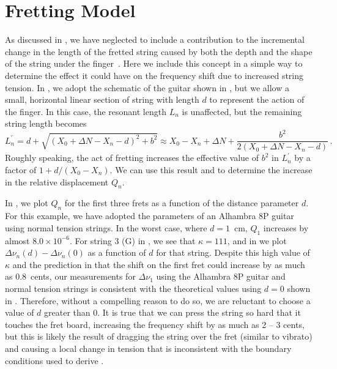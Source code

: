 %
%
%

 \section{Fretting Model\label{app:fret}}

As discussed in , we have neglected to include a contribution to the incremental change in the length of the fretted string caused by both the depth and the shape of the string under the finger~\cite{ref:byers1996cgi,ref:varieschi2010icf}. Here we include this concept in a simple way to determine the effect it could have on the frequency shift due to increased string tension. In , we adopt the schematic of the guitar shown in , but we allow a small, horizontal linear section of string with length $d$ to represent the action of the finger. In this case, the resonant length $L_n$ is unaffected, but the remaining string length becomes
 \begin{equation}
L^\prime_n = d + \sqrt{\left(X_0 + \Delta N - X_n - d\right)^2 + b^2} \approx X_0 - X_n + \Delta N + \frac{b^2}{2 \left(X_0 + \Delta N - X_n - d\right)}\, .
 \end{equation}
Roughly speaking, the act of fretting increases the effective value of $b^2$ in $L^\prime_n$ by a factor of $1 + d / (X_0 - X_n)$. We can use this result and  to determine the increase in the relative displacement $Q_n$.

In , we plot $Q_n$ for the first three frets as a function of the distance parameter $d$. For this example, we have adopted the parameters of an Alhambra 8P guitar using normal tension strings. In the worst case, where $d = 1$~cm, $Q_1$ increases by almost $8.0 \times 10^{-6}$. For string 3 (G) in , we see that $\kappa = 111$, and in  we plot $\Delta \nu_n(d) - \Delta \nu_n(0)$ as a function of $d$ for that string. Despite this high value of $\kappa$ and the prediction in  that the shift on the first fret could increase by as much as 0.8~cents, our measurements for $\Delta \nu_1$ using the Alhambra 8P guitar and normal tension strings is consistent with the theoretical values using $d = 0$ shown in . Therefore, without a compelling reason to do so, we are reluctant to choose a value of $d$ greater than 0. It is true that we can press the string so hard that it touches the fret board, increasing the frequency shift by as much as 2 -- 3 cents, but this is likely the result of dragging the string over the fret (similar to vibrato) and causing a local change in tension that is inconsistent with the boundary conditions used to derive .

